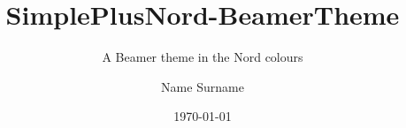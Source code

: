 \title{SimplePlusNord-BeamerTheme}
\subtitle{A Beamer theme in the Nord colours}
\author{Name Surname}
\date{\today}
